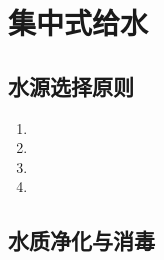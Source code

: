 \documentclass[10pt,a4paper,oneside]{ctexbook}
\begin{document}
\section{集中式给水}

\subsection{水源选择原则}

\begin{enumerate}[leftmargin=*]
    \item {} \item {} \item {} \item {}
\end{enumerate}

\subsection{水质净化与消毒}
\end{document}
